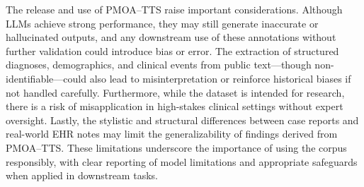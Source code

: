
The release and use of PMOA–TTS raise important considerations.
Although LLMs achieve strong performance, they may still generate inaccurate or hallucinated outputs, and any downstream use of these annotations without further validation could introduce bias or error.
The extraction of structured diagnoses, demographics, and clinical events from public text—though non-identifiable—could also lead to misinterpretation or reinforce historical biases if not handled carefully.
Furthermore, while the dataset is intended for research, there is a risk of misapplication in high-stakes clinical settings without expert oversight.
Lastly, the stylistic and structural differences between case reports and real-world EHR notes may limit the generalizability of findings derived from PMOA–TTS.
These limitations underscore the importance of using the corpus responsibly, with clear reporting of model limitations and appropriate safeguards when applied in downstream tasks.



